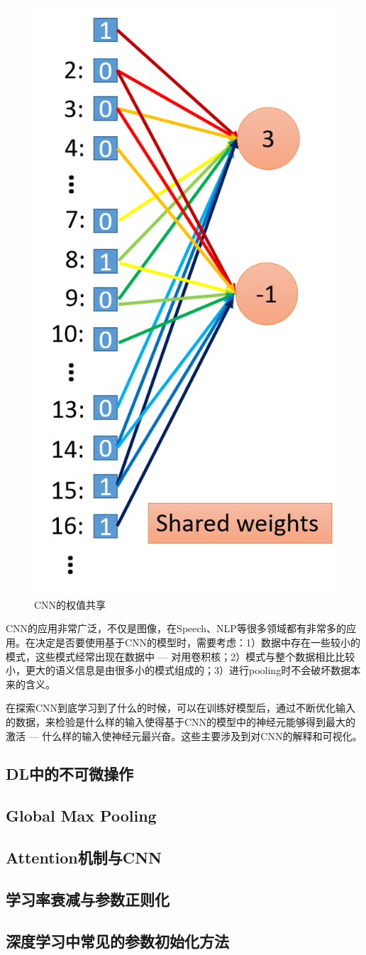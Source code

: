 \begin{figure}[h]
	\centering
	\includegraphics[width=.3\textwidth]{pics/share_weight.png}
	\caption{CNN的权值共享}
	\label{fig:share_weight}
\end{figure}

CNN的应用非常广泛，不仅是图像，在Speech、NLP等很多领域都有非常多的应用。在决定是否要使用基于CNN的模型时，需要考虑：1）数据中存在一些较小的模式，这些模式经常出现在数据中 --- 对用卷积核；2）模式与整个数据相比比较小，更大的语义信息是由很多小的模式组成的；3）进行pooling时不会破坏数据本来的含义。

在探索CNN到底学习到了什么的时候，可以在训练好模型后，通过不断优化输入的数据，来检验是什么样的输入使得基于CNN的模型中的神经元能够得到最大的激活 --- 什么样的输入使神经元最兴奋。这些主要涉及到对CNN的解释和可视化。

\subsection{DL中的不可微操作}



\subsection{Global Max Pooling}

\subsection{Attention机制与CNN}

\subsection{学习率衰减与参数正则化}

\subsection{深度学习中常见的参数初始化方法}
